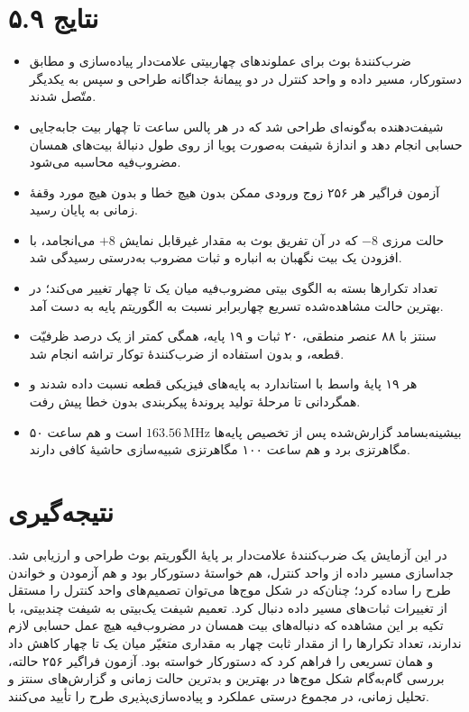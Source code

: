 \documentclass[12pt,a4paper]{article}
\begin{document}
	\section*{۵.۹ نتایج}
	\begin{itemize}
		\item ضرب‌کنندهٔ بوث برای عملوندهای چهاربیتی علامت‌دار پیاده‌سازی و مطابق دستورکار، مسیر داده و واحد کنترل در دو پیمانهٔ جداگانه طراحی و سپس به یکدیگر متّصل شدند.
		\item شیفت‌دهنده به‌گونه‌ای طراحی شد که در هر پالس ساعت تا چهار بیت جابه‌جایی حسابی انجام دهد و اندازهٔ شیفت به‌صورت پویا از روی طول دنبالهٔ بیت‌های همسان مضروب‌فیه محاسبه می‌شود.
		\item آزمون فراگیر هر ۲۵۶ زوج ورودی ممکن بدون هیچ خطا و بدون هیچ مورد وقفهٔ زمانی به پایان رسید.
		\item حالت مرزی \(-8\) که در آن تفریق بوث به مقدار غیرقابل نمایش \(+8\) می‌انجامد، با افزودن یک بیت نگهبان به انباره و ثبات مضروب به‌درستی رسیدگی شد.
		\item تعداد تکرارها بسته به الگوی بیتی مضروب‌فیه میان یک تا چهار تغییر می‌کند؛ در بهترین حالت مشاهده‌شده تسریع چهاربرابر نسبت به الگوریتم پایه به دست آمد.
		\item سنتز با ۸۸ عنصر منطقی، ۲۰ ثبات و ۱۹ پایه، همگی کمتر از یک درصد ظرفیّت قطعه، و بدون استفاده از ضرب‌کنندهٔ توکار تراشه انجام شد.
		\item هر ۱۹ پایهٔ واسط با استاندارد  به پایه‌های فیزیکی قطعه نسبت داده شدند و همگردانی تا مرحلهٔ تولید پروندهٔ پیکربندی بدون خطا پیش رفت.
		\item بیشینه‌بسامد گزارش‌شده پس از تخصیص پایه‌ها \(163.56\,\mathrm{MHz}\) است و هم ساعت ۵۰ مگاهرتزی برد و هم ساعت ۱۰۰ مگاهرتزی شبیه‌سازی حاشیهٔ کافی دارند.
	\end{itemize}

	\section*{نتیجه‌گیری}
	در این آزمایش یک ضرب‌کنندهٔ علامت‌دار بر پایهٔ الگوریتم بوث طراحی و ارزیابی شد. جداسازی مسیر داده از واحد کنترل، هم خواستهٔ دستورکار بود و هم آزمودن و خواندن طرح را ساده کرد؛ چنان‌که در شکل موج‌ها می‌توان تصمیم‌های واحد کنترل را مستقل از تغییرات ثبات‌های مسیر داده دنبال کرد. تعمیم شیفت یک‌بیتی به شیفت چندبیتی، با تکیه بر این مشاهده که دنباله‌های بیت همسان در مضروب‌فیه هیچ عمل حسابی لازم ندارند، تعداد تکرارها را از مقدار ثابت چهار به مقداری متغیّر میان یک تا چهار کاهش داد و همان تسریعی را فراهم کرد که دستورکار خواسته بود. آزمون فراگیر ۲۵۶ حالته، بررسی گام‌به‌گام شکل موج‌ها در بهترین و بدترین حالت زمانی و گزارش‌های سنتز و تحلیل زمانی، در مجموع درستی عملکرد و پیاده‌سازی‌پذیری طرح را تأیید می‌کنند.
\end{document}
